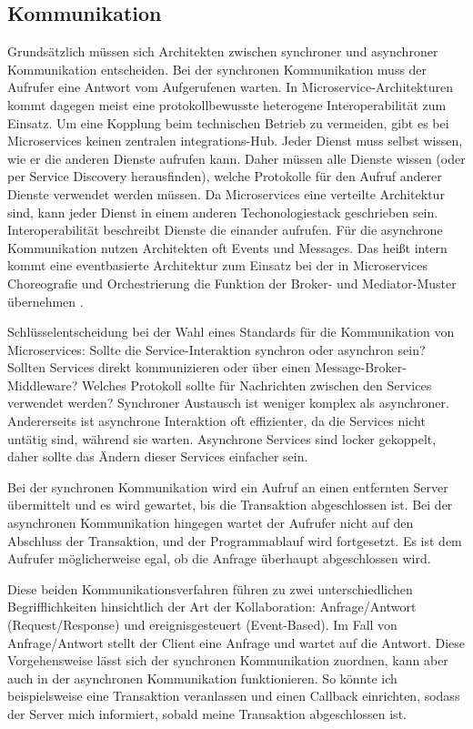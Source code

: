 {%
\pagebreak
\subsection{Kommunikation}

Grundsätzlich müssen sich Architekten zwischen synchroner und asynchroner Kommunikation entscheiden. Bei der synchronen Kommunikation muss der Aufrufer eine Antwort vom Aufgerufenen warten. In Microservice-Architekturen kommt dagegen meist eine protokollbewusste heterogene Interoperabilität zum Einsatz. Um eine Kopplung beim technischen Betrieb zu vermeiden, gibt es bei Microservices keinen zentralen integrations-Hub. Jeder Dienst muss selbst wissen, wie er die anderen Dienste aufrufen kann. Daher müssen alle Dienste wissen (oder per Service Discovery herausfinden), welche Protokolle für den Aufruf anderer Dienste verwendet werden müssen. Da Microservices eine verteilte Architektur sind, kann jeder Dienst in einem anderen Techonologiestack geschrieben sein. Interoperabilität beschreibt Dienste die einander aufrufen. Für die asynchrone Kommunikation nutzen Architekten oft Events und Messages. Das heißt intern kommt eine eventbasierte Architektur zum Einsatz bei der in Microservices Choreografie und Orchestrierung die Funktion der Broker- und Mediator-Muster übernehmen \cite[S.260,261]{richards}.

Schlüsselentscheidung bei der Wahl eines Standards für die Kommunikation von Microservices: Sollte die Service-Interaktion synchron oder asynchron sein? Sollten Services direkt kommunizieren oder über einen Message-Broker-Middleware? Welches Protokoll sollte für Nachrichten zwischen den Services verwendet werden?
Synchroner Austausch ist weniger komplex als asynchroner. Andererseits ist asynchrone Interaktion oft effizienter, da die Services nicht untätig sind, während sie warten. Asynchrone Services sind locker gekoppelt, daher sollte das Ändern dieser Services einfacher sein.
\cite[S.161-163]{sommerville}

Bei der synchronen Kommunikation wird ein Aufruf an einen entfernten Server übermittelt und es wird gewartet, bis die Transaktion abgeschlossen ist. Bei der asynchronen Kommunikation hingegen wartet der Aufrufer nicht auf den Abschluss der Transaktion, und der Programmablauf wird fortgesetzt. Es ist dem Aufrufer möglicherweise egal, ob die Anfrage überhaupt abgeschlossen wird.

Diese beiden Kommunikationsverfahren führen zu zwei unterschiedlichen Begrifflichkeiten hinsichtlich der Art der Kollaboration: Anfrage/Antwort (Request/Response) und ereignisgesteuert (Event-Based). Im Fall von Anfrage/Antwort stellt der Client eine Anfrage und wartet auf die Antwort. Diese Vorgehensweise lässt sich der synchronen Kommunikation zuordnen, kann aber auch in der asynchronen Kommunikation funktionieren. So könnte ich beispielsweise eine Transaktion veranlassen und einen Callback einrichten, sodass der Server mich informiert, sobald meine Transaktion abgeschlossen ist.

}
